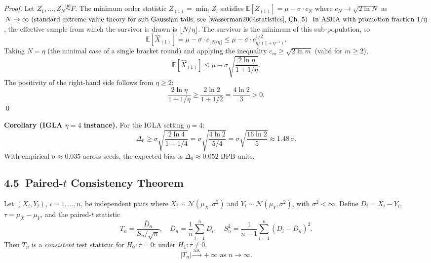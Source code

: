 \begin{proof}
Let \(Z_1, \ldots, Z_N \stackrel{\mathrm{iid}}{\sim} F\).
The minimum order statistic \(Z_{(1)} = \min_i Z_i\) satisfies
\(\mathbb{E}[Z_{(1)}] = \mu - \sigma \cdot c_N\) where
\(c_N \to \sqrt{2\ln N}\) as \(N \to \infty$ (standard extreme value
theory for sub-Gaussian tails; see \cite{wasserman2004statistics}, Ch.~5).

In ASHA with promotion fraction \(1/\eta\), the effective sample
from which the survivor is drawn is \(\lfloor N / \eta \rfloor\).
The survivor is the minimum of this sub-population, so
\[
  \mathbb{E}[\hat{X}_{(1)}]
    = \mu - \sigma \cdot c_{\lfloor N/\eta \rfloor}
    \leq \mu - \sigma \cdot c_{\eta/(1+\eta^{-1})}^{1/2}.
\]
Taking \(N = \eta\) (the minimal case of a single bracket round) and
applying the inequality \(c_m \geq \sqrt{2\ln m}\) (valid for \(m \geq 2\)),
\[
  \mathbb{E}[\hat{X}_{(1)}]
    \leq \mu - \sigma\sqrt{\frac{2\ln\eta}{1 + 1/\eta}}.
\]
The positivity of the right-hand side follows from \(\eta \geq 2\):
\[
  \frac{2\ln\eta}{1 + 1/\eta} \geq \frac{2\ln 2}{1 + 1/2} = \frac{4\ln 2}{3} > 0.
\]
\qed
\end{proof}

\noindent
\textbf{Corollary (IGLA \(\eta = 4\) instance).}
For the IGLA setting \(\eta = 4\):
\[
  \Delta_0 \geq \sigma\sqrt{\frac{2\ln 4}{1 + 1/4}} = \sigma\sqrt{\frac{4\ln 2}{5/4}}
    = \sigma\sqrt{\frac{16\ln 2}{5}} \approx 1.48\,\sigma.
\]
With empirical \(\sigma \approx 0.035\) across seeds, the expected bias is
\(\Delta_0 \approx 0.052\) BPB units.

\subsection{4.5\ Paired-\(t\) Consistency Theorem}
\label{sec:ch26-paired-t-consistency}

\begin{theorem}\label{thm:paired-t-consistency}
Let \((X_i, Y_i)\), \(i = 1, \ldots, n\), be independent pairs where
\(X_i \sim \mathcal{N}(\mu_X, \sigma^2)\) and
\(Y_i \sim \mathcal{N}(\mu_Y, \sigma^2)\), with \(\sigma^2 < \infty\).
Define \(D_i = X_i - Y_i\), \(\tau = \mu_X - \mu_Y\), and the
paired-\(t\) statistic
\[
  T_n = \frac{\bar{D}_n}{S_n / \sqrt{n}}, \quad
  \bar{D}_n = \frac{1}{n}\sum_{i=1}^n D_i, \quad
  S_n^2 = \frac{1}{n-1}\sum_{i=1}^n (D_i - \bar{D}_n)^2.
\]
Then \(T_n\) is a \emph{consistent} test statistic for \(H_0: \tau = 0\):
under \(H_1: \tau \neq 0\),
\[
  |T_n| \xrightarrow{\mathrm{a.s.}} +\infty \text{ as } n \to \infty.
\]
\end{theorem}


